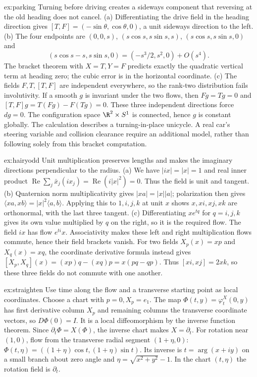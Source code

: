 \begin{solution}{ex:parking}
\idea Turning before driving creates a sideways component that reversing at the old heading does not cancel.
\writeup (a) Differentiating the drive field in the heading direction gives $[T,F]=(-\sin\theta,\cos\theta,0)$, a unit sideways direction to the left.
(b) The four endpoints are $(0,0,s)$, $(s\cos s,s\sin s,s)$, $(s\cos s,s\sin s,0)$ and
\[
(s\cos s-s,s\sin s,0)=(-s^3/2,s^2,0)+O(s^4).
\]
The bracket theorem with $X=T,Y=F$ predicts exactly the quadratic vertical term at heading zero; the cubic error is in the horizontal coordinate.
(c) The fields $F,T,[T,F]$ are independent everywhere, so the rank-two distribution fails involutivity. If a smooth $g$ is invariant under the two flows, then $Fg=Tg=0$ and $[T,F]g=T(Fg)-F(Tg)=0$. These three independent directions force $dg=0$. The configuration space $\R^2\times S^1$ is connected, hence $g$ is constant globally. The calculation describes a turning-in-place unicycle. A real car's steering variable and collision clearance require an additional model, rather than following solely from this bracket computation.
\end{solution}

\begin{solution}{ex:hairyodd}
\idea Unit multiplication preserves lengths and makes the imaginary directions perpendicular to the radius.
\writeup (a) We have $|ix|=|x|=1$ and real inner product $\operatorname{Re}\sum_j\bar x_j(ix_j)=\operatorname{Re}(i|x|^2)=0$. Thus the field is unit and tangent.
(b) Quaternion norm multiplicativity gives $|xa|=|x||a|$; polarization then gives $\langle xa,xb\rangle=|x|^2\langle a,b\rangle$. Applying this to $1,i,j,k$ at unit $x$ shows $x,xi,xj,xk$ are orthonormal, with the last three tangent.
(c) Differentiating $xe^{tq}$ for $q=i,j,k$ gives its own value multiplied by $q$ on the right, so it is the required flow. The field $ix$ has flow $e^{ti}x$. Associativity makes these left and right multiplication flows commute, hence their field brackets vanish. For two fields $X_p(x)=xp$ and $X_q(x)=xq$, the coordinate derivative formula instead gives
$[X_p,X_q](x)=(xp)q-(xq)p=x(pq-qp)$.
Thus $[xi,xj]=2xk$, so these three fields do not commute with one another.
\end{solution}

\begin{solution}{ex:straighten}
\idea Use time along the flow and a transverse starting point as local coordinates.
\writeup Choose a chart with $p=0,X_p=e_1$. The map $\Phi(t,y)=\varphi^X_t(0,y)$ has first derivative column $X_p$ and remaining columns the transverse coordinate vectors, so $D\Phi(0)=I$. It is a local diffeomorphism by the inverse function theorem. Since $\partial_t\Phi=X(\Phi)$, the inverse chart makes $X=\partial_t$.
For rotation near $(1,0)$, flow from the transverse radial segment $(1+\eta,0)$:
$\Phi(t,\eta)=((1+\eta)\cos t,(1+\eta)\sin t)$. Its inverse is $t=\arg(x+iy)$ on a small branch about zero angle and $\eta=\sqrt{x^2+y^2}-1$. In the chart $(t,\eta)$ the rotation field is $\partial_t$.
\end{solution}

